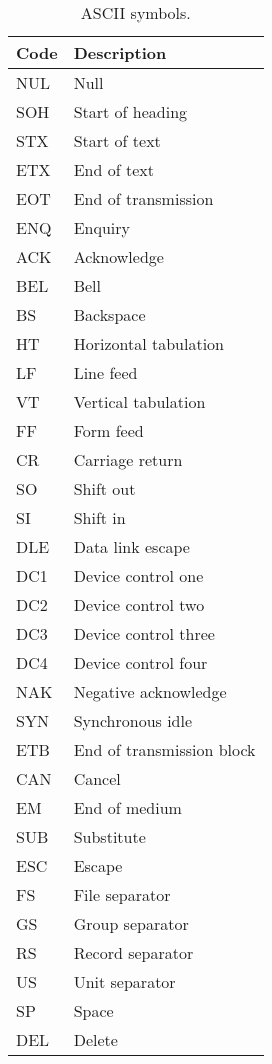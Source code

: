 \begin{table}[h]
  \centering
  \begin{tabular}{|l|l|}
    \hline
    \rowcolor{headerRowColor} Code & Description\\
    \hline
    NUL & Null\\
    SOH & Start of heading\\
    STX & Start of text\\
    ETX & End of text\\
    EOT & End of transmission\\
    ENQ & Enquiry\\
    ACK & Acknowledge\\
    BEL & Bell\\
    BS & Backspace\\
    HT & Horizontal tabulation\\
    LF & Line feed\\
    VT & Vertical tabulation\\
    FF & Form feed\\
    CR & Carriage return\\
    SO & Shift out\\
    SI & Shift in\\
    DLE & Data link escape\\
    DC1 & Device control one\\
    DC2 & Device control two\\
    DC3 & Device control three\\
    DC4 & Device control four\\
    NAK & Negative acknowledge\\
    SYN & Synchronous idle\\
    ETB & End of transmission block\\
    CAN & Cancel\\
    EM & End of medium\\
    SUB & Substitute\\
    ESC & Escape\\
    FS & File separator\\
    GS & Group separator\\
    RS & Record separator\\
    US & Unit separator\\
    SP & Space\\
    DEL & Delete\\
    \hline
  \end{tabular}
  \caption{ASCII symbols.}
  \label{tab:asciiSpecialSymbols}
\end{table}

